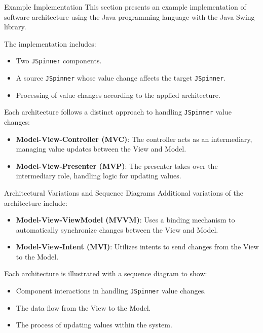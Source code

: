 \documentclass[aspectratio=169, table]{beamer}
\begin{document}
\begin{frame}[fragile]{Example Implementation}
	\vspace{20pt}
	This section presents an example implementation of software architecture using the Java programming language with the Java Swing library.
	
	The implementation includes:
	\begin{itemize}
		\item Two \texttt{JSpinner} components.
		\item A source \texttt{JSpinner} whose value change affects the target \texttt{JSpinner}.
		\item Processing of value changes according to the applied architecture.
	\end{itemize}
	
	Each architecture follows a distinct approach to handling \texttt{JSpinner} value changes:
	\begin{itemize}
		\item \textbf{Model-View-Controller (MVC)}: The controller acts as an intermediary, managing value updates between the View and Model.
		\item \textbf{Model-View-Presenter (MVP)}: The presenter takes over the intermediary role, handling logic for updating values.
	\end{itemize}
\end{frame}

\begin{frame}[fragile]{\LARGE{Architectural Variations and Sequence Diagrams}}
	\vspace{20pt}
	Additional variations of the architecture include:
	\begin{itemize}
		\item \textbf{Model-View-ViewModel (MVVM)}: Uses a binding mechanism to automatically synchronize changes between the View and Model.
		\item \textbf{Model-View-Intent (MVI)}: Utilizes intents to send changes from the View to the Model.
	\end{itemize}
	
	Each architecture is illustrated with a sequence diagram to show:
	\begin{itemize}
		\item Component interactions in handling \texttt{JSpinner} value changes.
		\item The data flow from the View to the Model.
		\item The process of updating values within the system.
	\end{itemize}
\end{frame}
\end{document}
